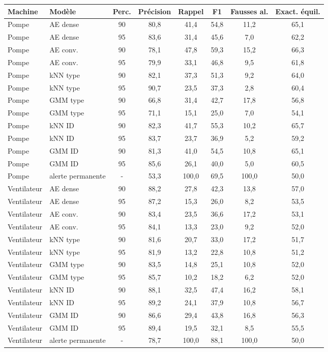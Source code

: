 \begin{tabular}{llcccccc}
\toprule
Machine & Modèle & Perc. & Précision & Rappel & F1 & Fausses al. & Exact. équil. \\
\midrule
Pompe & AE dense & 90 & 80,8 & 41,4 & 54,8 & 11,2 & 65,1 \\
Pompe & AE dense & 95 & 83,6 & 31,4 & 45,6 & 7,0 & 62,2 \\
Pompe & AE conv. & 90 & 78,1 & 47,8 & 59,3 & 15,2 & 66,3 \\
Pompe & AE conv. & 95 & 79,9 & 33,1 & 46,8 & 9,5 & 61,8 \\
Pompe & kNN type & 90 & 82,1 & 37,3 & 51,3 & 9,2 & 64,0 \\
Pompe & kNN type & 95 & 90,7 & 23,5 & 37,3 & 2,8 & 60,4 \\
Pompe & GMM type & 90 & 66,8 & 31,4 & 42,7 & 17,8 & 56,8 \\
Pompe & GMM type & 95 & 71,1 & 15,1 & 25,0 & 7,0 & 54,1 \\
Pompe & kNN ID & 90 & 82,3 & 41,7 & 55,3 & 10,2 & 65,7 \\
Pompe & kNN ID & 95 & 83,7 & 23,7 & 36,9 & 5,2 & 59,2 \\
Pompe & GMM ID & 90 & 81,3 & 41,0 & 54,5 & 10,8 & 65,1 \\
Pompe & GMM ID & 95 & 85,6 & 26,1 & 40,0 & 5,0 & 60,5 \\
Pompe & alerte permanente & - & 53,3 & 100,0 & 69,5 & 100,0 & 50,0 \\
\midrule
Ventilateur & AE dense & 90 & 88,2 & 27,8 & 42,3 & 13,8 & 57,0 \\
Ventilateur & AE dense & 95 & 87,2 & 15,3 & 26,0 & 8,2 & 53,5 \\
Ventilateur & AE conv. & 90 & 83,4 & 23,5 & 36,6 & 17,2 & 53,1 \\
Ventilateur & AE conv. & 95 & 84,1 & 13,3 & 23,0 & 9,2 & 52,0 \\
Ventilateur & kNN type & 90 & 81,6 & 20,7 & 33,0 & 17,2 & 51,7 \\
Ventilateur & kNN type & 95 & 81,9 & 13,2 & 22,8 & 10,8 & 51,2 \\
Ventilateur & GMM type & 90 & 83,5 & 14,8 & 25,1 & 10,8 & 52,0 \\
Ventilateur & GMM type & 95 & 85,7 & 10,2 & 18,2 & 6,2 & 52,0 \\
Ventilateur & kNN ID & 90 & 88,1 & 32,5 & 47,4 & 16,2 & 58,1 \\
Ventilateur & kNN ID & 95 & 89,2 & 24,1 & 37,9 & 10,8 & 56,7 \\
Ventilateur & GMM ID & 90 & 86,6 & 29,4 & 43,8 & 16,8 & 56,3 \\
Ventilateur & GMM ID & 95 & 89,4 & 19,5 & 32,1 & 8,5 & 55,5 \\
Ventilateur & alerte permanente & - & 78,7 & 100,0 & 88,1 & 100,0 & 50,0 \\
\bottomrule
\end{tabular}